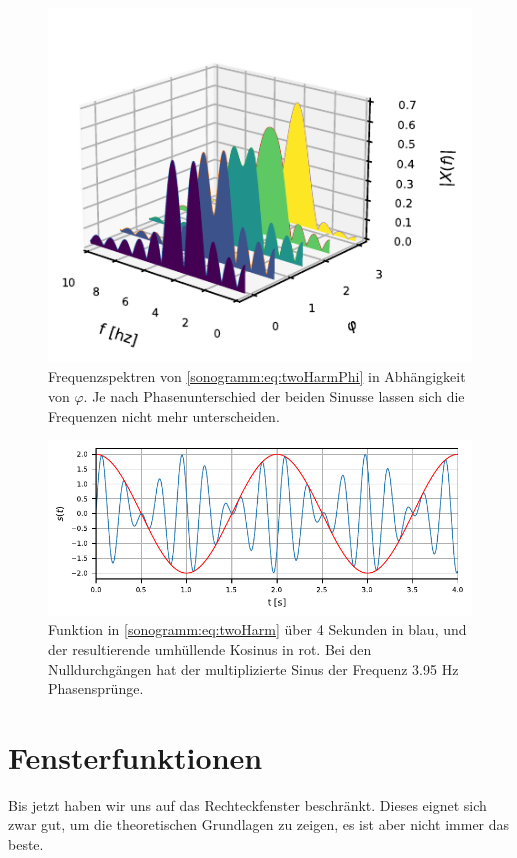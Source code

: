 \begin{figure}
    \centering
    \includegraphics{papers/sonogramm/images/twoharmphasedifff.pdf}
    \caption{Frequenzspektren von \eqref{sonogramm:eq:twoHarmPhi} in Abhängigkeit von $\varphi$.
    Je nach Phasenunterschied der beiden Sinusse lassen sich die Frequenzen nicht mehr unterscheiden.
    \label{sonogramm:freqdiffdemo}
    }
\end{figure}

\begin{figure}
    \centering
    \includegraphics{papers/sonogramm/images/twoharmTime.pdf}
    \caption{Funktion in \eqref{sonogramm:eq:twoHarm} über 4 Sekunden in blau, und der resultierende
    umhüllende Kosinus in rot.
    Bei den Nulldurchgängen hat der multiplizierte Sinus der Frequenz 3.95 Hz Phasensprünge.
    \label{sonogramm:twoHarmTime}
    }
\end{figure}

%
%
\section{Fensterfunktionen}
\label{sonogramm:section:windows}
Bis jetzt haben wir uns auf das Rechteckfenster beschränkt.
Dieses eignet sich zwar gut, um die theoretischen Grundlagen zu zeigen,
es ist aber nicht immer das beste.

